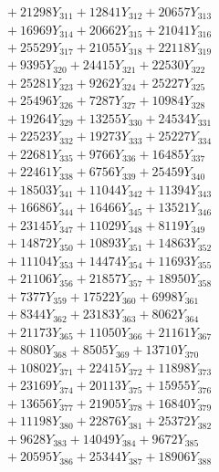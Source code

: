 \documentclass[a4paper,10pt]{article}
\begin{document}
{\begin{align}
&\;  + 21298 Y_{311} + 12841 Y_{312} + 20657 Y_{313} \\[0.3ex]
&\;  + 16969 Y_{314} + 20662 Y_{315} + 21041 Y_{316} \\[0.3ex]
&\;  + 25529 Y_{317} + 21055 Y_{318} + 22118 Y_{319} \\[0.3ex]
&\;  + 9395 Y_{320} + 24415 Y_{321} + 22530 Y_{322} \\[0.3ex]
&\;  + 25281 Y_{323} + 9262 Y_{324} + 25227 Y_{325} \\[0.3ex]
&\;  + 25496 Y_{326} + 7287 Y_{327} + 10984 Y_{328} \\[0.5ex]\allowbreak
&\;  + 19264 Y_{329} + 13255 Y_{330} + 24534 Y_{331} \\[0.3ex]
&\;  + 22523 Y_{332} + 19273 Y_{333} + 25227 Y_{334} \\[0.3ex]
&\;  + 22681 Y_{335} + 9766 Y_{336} + 16485 Y_{337} \\[0.3ex]
&\;  + 22461 Y_{338} + 6756 Y_{339} + 25459 Y_{340} \\[0.3ex]
&\;  + 18503 Y_{341} + 11044 Y_{342} + 11394 Y_{343} \\[0.3ex]
&\;  + 16686 Y_{344} + 16466 Y_{345} + 13521 Y_{346} \\[0.3ex]
&\;  + 23145 Y_{347} + 11029 Y_{348} + 8119 Y_{349} \\[0.3ex]
&\;  + 14872 Y_{350} + 10893 Y_{351} + 14863 Y_{352} \\[0.3ex]
&\;  + 11104 Y_{353} + 14474 Y_{354} + 11693 Y_{355} \\[0.3ex]
&\;  + 21106 Y_{356} + 21857 Y_{357} + 18950 Y_{358} \\[0.5ex]\allowbreak
&\;  + 7377 Y_{359} + 17522 Y_{360} + 6998 Y_{361} \\[0.3ex]
&\;  + 8344 Y_{362} + 23183 Y_{363} + 8062 Y_{364} \\[0.3ex]
&\;  + 21173 Y_{365} + 11050 Y_{366} + 21161 Y_{367} \\[0.3ex]
&\;  + 8080 Y_{368} + 8505 Y_{369} + 13710 Y_{370} \\[0.3ex]
&\;  + 10802 Y_{371} + 22415 Y_{372} + 11898 Y_{373} \\[0.3ex]
&\;  + 23169 Y_{374} + 20113 Y_{375} + 15955 Y_{376} \\[0.3ex]
&\;  + 13656 Y_{377} + 21905 Y_{378} + 16840 Y_{379} \\[0.3ex]
&\;  + 11198 Y_{380} + 22876 Y_{381} + 25372 Y_{382} \\[0.3ex]
&\;  + 9628 Y_{383} + 14049 Y_{384} + 9672 Y_{385} \\[0.3ex]
&\;  + 20595 Y_{386} + 25344 Y_{387} + 18906 Y_{388} \\[0.5ex]\allowbreak

\end{align}}
\end{document}
